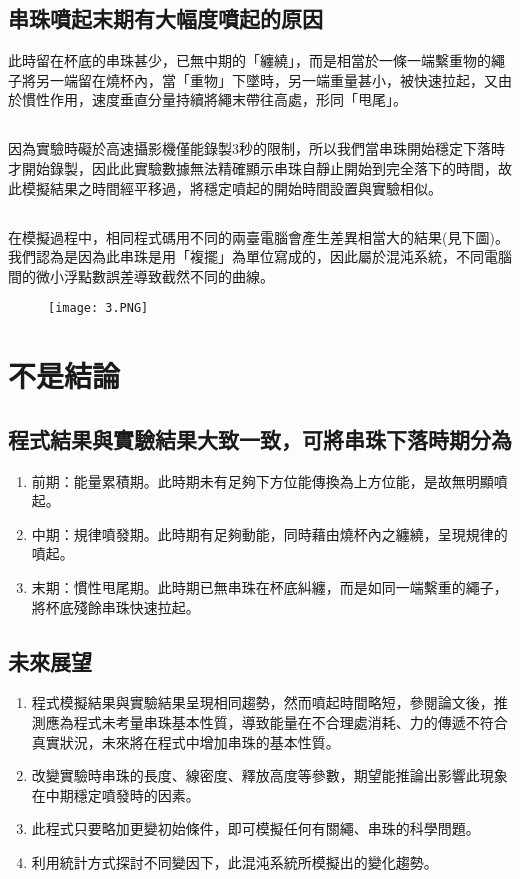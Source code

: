 \documentclass[11pt,twoside,b5paper]{article}
\begin{document}
\subsection{串珠噴起末期有大幅度噴起的原因}
此時留在杯底的串珠甚少，已無中期的「纏繞」，而是相當於一條一端繫重物的繩子將另一端留在燒杯內，當「重物」下墜時，另一端重量甚小，被快速拉起，又由於慣性作用，速度垂直分量持續將繩末帶往高處，形同「甩尾」。

\subsection{}
因為實驗時礙於高速攝影機僅能錄製3秒的限制，所以我們當串珠開始穩定下落時才開始錄製，因此此實驗數據無法精確顯示串珠自靜止開始到完全落下的時間，故此模擬結果之時間經平移過，將穩定噴起的開始時間設置與實驗相似。

\subsection{}
在模擬過程中，相同程式碼用不同的兩臺電腦會產生差異相當大的結果(見下圖)。我們認為是因為此串珠是用「複擺」為單位寫成的，因此屬於混沌系統，不同電腦間的微小浮點數誤差導致截然不同的曲線。

\begin{figure}[H]
    \centering
    \texttt{[image: 3.PNG]}
\end{figure}

\section{不是結論}

\subsection{程式結果與實驗結果大致一致，可將串珠下落時期分為}
\begin{enumerate}
    \item 前期：能量累積期。此時期未有足夠下方位能傳換為上方位能，是故無明顯噴起。 
    \item 中期：規律噴發期。此時期有足夠動能，同時藉由燒杯內之纏繞，呈現規律的噴起。
    \item 末期：慣性甩尾期。此時期已無串珠在杯底糾纏，而是如同一端繫重的繩子，將杯底殘餘串珠快速拉起。
\end{enumerate}

\subsection{未來展望}
\begin{enumerate}
    \item 程式模擬結果與實驗結果呈現相同趨勢，然而噴起時間略短，參閱論文後，推測應為程式未考量串珠基本性質，導致能量在不合理處消耗、力的傳遞不符合真實狀況，未來將在程式中增加串珠的基本性質。
    \item 改變實驗時串珠的長度、線密度、釋放高度等參數，期望能推論出影響此現象在中期穩定噴發時的因素。
    \item 此程式只要略加更變初始條件，即可模擬任何有關繩、串珠的科學問題。
    \item 利用統計方式探討不同變因下，此混沌系統所模擬出的變化趨勢。
\end{enumerate}

\medskip
\renewcommand{\refname}{\S\quad 參考資料}
\nocite{*}


\end{document}
